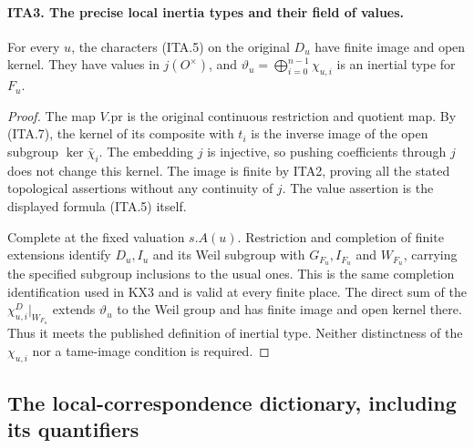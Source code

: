 \documentclass[11pt,a4paper]{article}
\numberwithin{equation}{section}
\theoremstyle{remark}\newtheorem{remark}[theorem]{Remark}
\begin{document}
\paragraph{ITA3. The precise local inertia types and their field of values.}
\label{claim:ITA3}
For every $u$, the characters (ITA.5) on the original $D_u$
have finite image and open kernel.  They have values in
$j(O^\times)$, and
$\vartheta_u=\bigoplus_{i=0}^{n-1}\chi_{u,i}$ is an
inertial type for $F_u$.
\begin{proof}
The map $V.\mathrm{pr}$ is the original continuous restriction
and quotient map.  By (ITA.7), the kernel of its composite
with $t_i$ is the inverse image of the open subgroup
$\ker\bar\chi_i$.  The embedding $j$ is injective, so
pushing coefficients through $j$ does not change this
kernel.  The image is finite by ITA2, proving all the stated
topological assertions without any continuity of $j$.
The value assertion is the displayed formula (ITA.5) itself.

Complete at the fixed valuation $s.A(u)$.  Restriction and
completion of finite extensions identify $D_u,I_u$ and its
Weil subgroup with $G_{F_u},I_{F_u}$ and $W_{F_u}$, carrying
the specified subgroup inclusions to the usual ones.  This
is the same completion identification used in KX3 and is
valid at every finite place.  The direct sum of the
$\chi^D_{u,i}|_{W_{F_u}}$ extends $\vartheta_u$ to the
Weil group and has finite image and open kernel there.
Thus it meets the published definition of inertial type.
Neither distinctness of the $\chi_{u,i}$ nor a tame-image
condition is required.
\end{proof}

\subsection{The local-correspondence dictionary, including its quantifiers}
\end{document}
